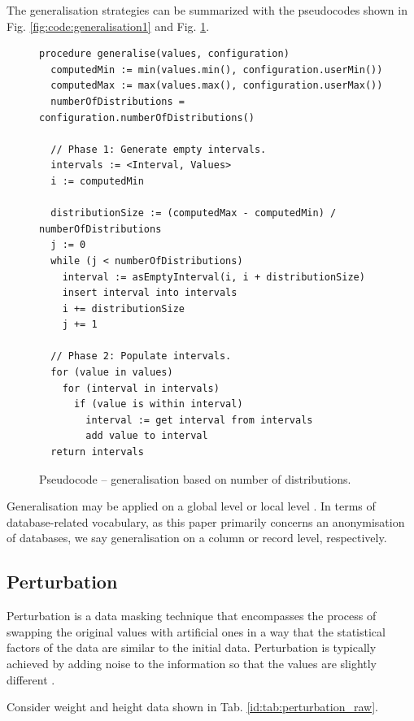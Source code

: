\documentclass[a4paper,twoside,12pt]{book}
\begin{document}
The generalisation strategies can be summarized with the pseudocodes shown in Fig. \ref{fig:code:generalisation1} and Fig. \ref{fig:code:generalisation2}.

\begin{figure}[h]
\begin{verbatim}
procedure generalise(values, configuration)
  computedMin := min(values.min(), configuration.userMin())
  computedMax := max(values.max(), configuration.userMax())
  numberOfDistributions = configuration.numberOfDistributions()

  // Phase 1: Generate empty intervals.
  intervals := <Interval, Values>
  i := computedMin
  
  distributionSize := (computedMax - computedMin) / numberOfDistributions
  j := 0    
  while (j < numberOfDistributions)
    interval := asEmptyInterval(i, i + distributionSize)
    insert interval into intervals
    i += distributionSize
    j += 1

  // Phase 2: Populate intervals.
  for (value in values)
    for (interval in intervals)
      if (value is within interval)
        interval := get interval from intervals
        add value to interval
  return intervals
\end{verbatim}
\caption{Pseudocode – generalisation based on number of distributions.}
\label{fig:code:generalisation2}
\end{figure}

Generalisation may be applied on a global level or local level \cite{bib:anonymization_extensive_study}. In terms of database-related vocabulary, as this paper primarily concerns an anonymisation of databases, we say generalisation on a column or record level, respectively.

\subsection{Perturbation}

Perturbation is a data masking technique that encompasses the process of swapping the original values with artificial ones in a way that the statistical factors of the data are similar to the initial data. Perturbation is typically achieved by adding noise to the information so that the values are slightly different \cite{bib:anonymization_directory_structured}. 

Consider weight and height data shown in Tab. \ref{id:tab:perturbation_raw}.
\end{document}
